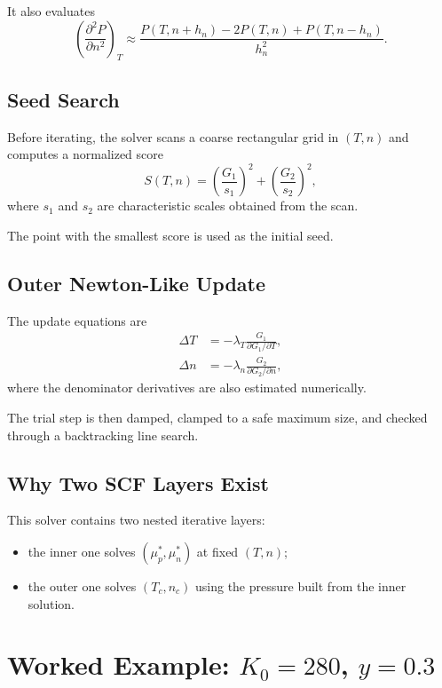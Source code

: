 \documentclass[11pt]{article}
\begin{document}
It also evaluates
\begin{equation}
\left(\frac{\partial^2 P}{\partial n^2}\right)_T
\approx
\frac{P(T,n+h_n)-2P(T,n)+P(T,n-h_n)}{h_n^2}.
\end{equation}

\subsection{Seed Search}

Before iterating, the solver scans a coarse rectangular grid in $(T,n)$ and
computes a normalized score
\begin{equation}
S(T,n)=\left(\frac{G_1}{s_1}\right)^2+\left(\frac{G_2}{s_2}\right)^2,
\end{equation}
where $s_1$ and $s_2$ are characteristic scales obtained from the scan.

The point with the smallest score is used as the initial seed.

\subsection{Outer Newton-Like Update}

The update equations are
\begin{align}
\Delta T
&=
-\lambda_T \frac{G_1}{\partial G_1/\partial T}, \\
\Delta n
&=
-\lambda_n \frac{G_2}{\partial G_2/\partial n},
\end{align}
where the denominator derivatives are also estimated numerically.

The trial step is then damped, clamped to a safe maximum size, and checked
through a backtracking line search.

\subsection{Why Two SCF Layers Exist}

This solver contains two nested iterative layers:
\begin{itemize}
\item the inner one solves $(\mu_p^\ast,\mu_n^\ast)$ at fixed $(T,n)$;
\item the outer one solves $(T_c,n_c)$ using the pressure built from the inner
solution.
\end{itemize}

\section{Worked Example: \texorpdfstring{$K_0=280$}{K0=280}, \texorpdfstring{$y=0.3$}{y=0.3}}
\end{document}

